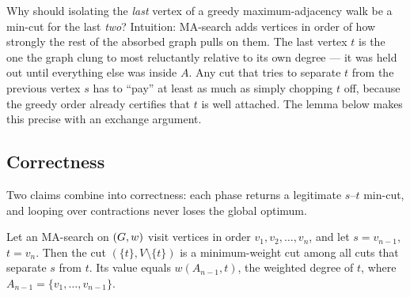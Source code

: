 \begin{intuitionbox}
Why should isolating the \emph{last} vertex of a greedy maximum-adjacency walk be a min-cut for the last \emph{two}? Intuition: MA-search adds vertices in order of how strongly the rest of the absorbed graph pulls on them. The last vertex $t$ is the one the graph clung to most reluctantly relative to its own degree --- it was held out until everything else was inside $A$. Any cut that tries to separate $t$ from the previous vertex $s$ has to ``pay'' at least as much as simply chopping $t$ off, because the greedy order already certifies that $t$ is well attached. The lemma below makes this precise with an exchange argument.
\end{intuitionbox}

\subsection{Correctness}

Two claims combine into correctness: each phase returns a legitimate $s$--$t$ min-cut, and looping over contractions never loses the global optimum.

\begin{lemma}\label{ch11:lem-phase}
Let an MA-search on $(G,w)$ visit vertices in order $v_1,v_2,\dots,v_n$, and let $s=v_{n-1}$, $t=v_n$. Then the cut $(\{t\}, V\setminus\{t\})$ is a minimum-weight cut among all cuts that separate $s$ from $t$. Its value equals $w(A_{n-1}, t)$, the weighted degree of $t$, where $A_{n-1}=\{v_1,\dots,v_{n-1}\}$.
\end{lemma}

